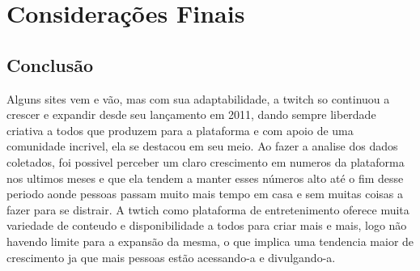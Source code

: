 \chapter{Considerações Finais} \label{consideracoes}
\section{Conclusão}\label{conclusao}
Alguns sites vem e vão, mas com sua adaptabilidade, a twitch so continuou a crescer e expandir desde seu lançamento em 2011, dando sempre liberdade criativa a todos que produzem para a plataforma e com apoio de uma comunidade incrivel, ela se destacou em seu meio.
Ao fazer a analise dos dados coletados, foi possivel perceber um claro crescimento em numeros da plataforma nos ultimos meses e que ela tendem a manter esses números alto até o fim desse periodo aonde pessoas passam muito mais tempo em casa e sem muitas coisas a fazer para se distrair. A twtich como plataforma de entretenimento oferece muita variedade de conteudo e disponibilidade a todos para criar mais e mais, logo não havendo limite para a expansão da mesma, o que implica uma tendencia maior de crescimento ja que mais pessoas estão acessando-a e divulgando-a.


